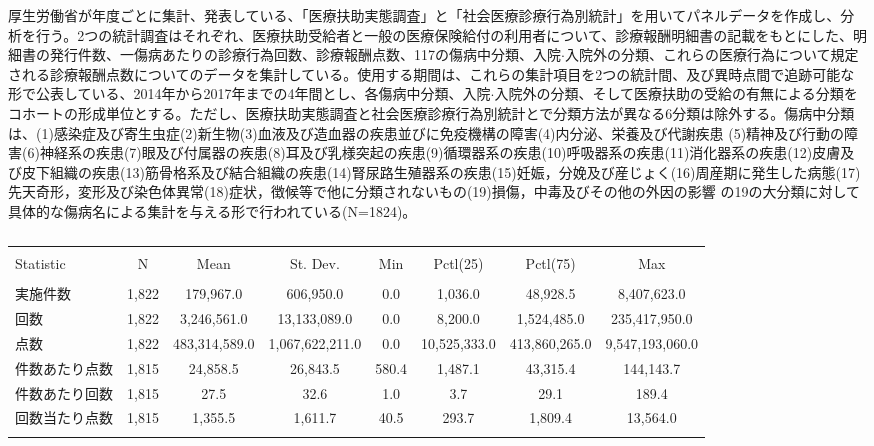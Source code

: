 \documentclass{jsarticle}
\begin{document}
厚生労働省が年度ごとに集計、発表している、「医療扶助実態調査」と「社会医療診療行為別統計」を用いてパネルデータを作成し、分析を行う。2つの統計調査はそれぞれ、医療扶助受給者と一般の医療保険給付の利用者について、診療報酬明細書の記載をもとにした、明細書の発行件数、一傷病あたりの診療行為回数、診療報酬点数、117の傷病中分類、入院$\cdot$入院外の分類、これらの医療行為について規定される診療報酬点数についてのデータを集計している。使用する期間は、これらの集計項目を2つの統計間、及び異時点間で追跡可能な形で公表している、2014年から2017年までの4年間とし、各傷病中分類、入院$\cdot$入院外の分類、そして医療扶助の受給の有無による分類をコホートの形成単位とする。ただし、医療扶助実態調査と社会医療診療行為別統計とで分類方法が異なる6分類は除外する。傷病中分類は、(1)感染症及び寄生虫症(2)新生物(3)血液及び造血器の疾患並びに免疫機構の障害(4)内分泌、栄養及び代謝疾患 (5)精神及び行動の障害(6)神経系の疾患(7)眼及び付属器の疾患(8)耳及び乳様突起の疾患(9)循環器系の疾患(10)呼吸器系の疾患(11)消化器系の疾患(12)皮膚及び皮下組織の疾患(13)筋骨格系及び結合組織の疾患(14)腎尿路生殖器系の疾患(15)妊娠，分娩及び産じょく(16)周産期に発生した病態(17)先天奇形，変形及び染色体異常(18)症状，徴候等で他に分類されないもの(19)損傷，中毒及びその他の外因の影響 の19の大分類に対して具体的な傷病名による集計を与える形で行われている(N=1824)。

\begin{table}[!htbp] \centering 
  \caption{} 
  \label{} 
\begin{tabular}{@{\extracolsep{3pt}}lccccccc} 
\\[-1.8ex]\hline 
\hline \\[-1.8ex] 
Statistic & \multicolumn{1}{c}{N} & \multicolumn{1}{c}{Mean} & \multicolumn{1}{c}{St. Dev.} & \multicolumn{1}{c}{Min} & \multicolumn{1}{c}{Pctl(25)} & \multicolumn{1}{c}{Pctl(75)} & \multicolumn{1}{c}{Max} \\ 
\hline \\[-1.8ex] 
実施件数 & 1,822 & 179,967.0 & 606,950.0 & 0.0 & 1,036.0 & 48,928.5 & 8,407,623.0 \\ 
回数 & 1,822 & 3,246,561.0 & 13,133,089.0 & 0.0 & 8,200.0 & 1,524,485.0 & 235,417,950.0 \\ 
点数 & 1,822 & 483,314,589.0 & 1,067,622,211.0 & 0.0 & 10,525,333.0 & 413,860,265.0 & 9,547,193,060.0 \\ 
件数あたり点数 & 1,815 & 24,858.5 & 26,843.5 & 580.4 & 1,487.1 & 43,315.4 & 144,143.7 \\ 
件数あたり回数 & 1,815 & 27.5 & 32.6 & 1.0 & 3.7 & 29.1 & 189.4 \\ 
回数当たり点数 & 1,815 & 1,355.5 & 1,611.7 & 40.5 & 293.7 & 1,809.4 & 13,564.0 \\ 
\hline \\[-1.8ex] 
\end{tabular} 
\end{table} 
\end{document}

